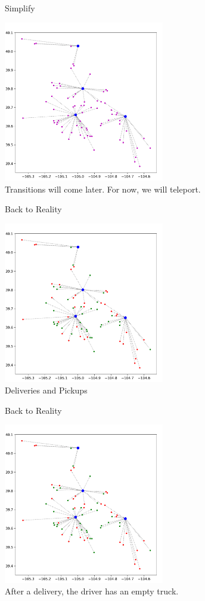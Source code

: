 \documentclass{beamer}
\begin{document}
\begin{frame}{Simplify}
	\begin{center}
	\includegraphics[width=7cm]{all_switch_star.png}\\
	Transitions will come later. For now, we will teleport.
	\end{center}
\end{frame}

\begin{frame}{Back to Reality}
	\begin{center}
	\includegraphics[width=7cm]{stars.png}\\
	Deliveries and Pickups
	\end{center}
\end{frame}

\begin{frame}{Back to Reality}
	\begin{center}
	\includegraphics[width=7cm]{stars.png}\\
	After a delivery, the driver has an empty truck.
	\end{center}
\end{frame}
\end{document}
